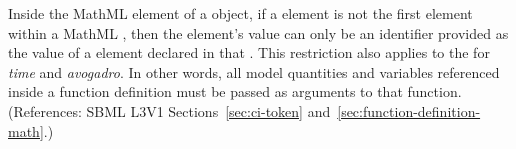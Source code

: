 Inside the  MathML element of a \FunctionDefinition object,
if a  element is not the first element within a MathML
, then the  element's value can only be an
identifier provided as the value of a  element declared in that
.  This restriction also applies to the  for
\emph{time} and \emph{avogadro}.  In other words, all model quantities and
variables referenced inside a function definition must be passed as
arguments to that function.  (References: SBML L3V1
Sections~\ref{sec:ci-token} and~\ref{sec:function-definition-math}.)
